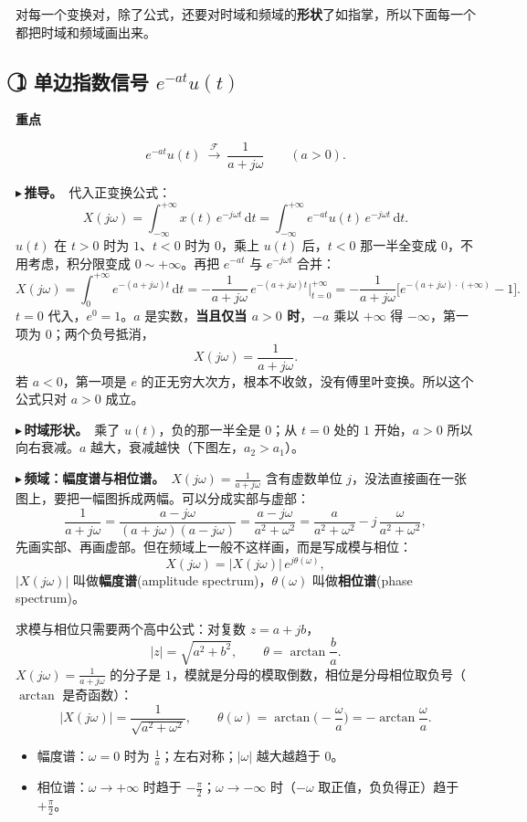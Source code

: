 \documentclass[UTF8,a4paper,11pt]{ctexart}
\newcommand{\dd}{\mathrm{d}}
\newcommand{\F}{\mathcal{F}}
\newenvironment{remember}{\begin{rememberbox}\textbf{重点}\par\smallskip}{\end{rememberbox}}
\newcounter{ex}[section]
\newcommand{\point}[1]{\par\addvspace{1ex}\noindent\textcolor{ptteal}{$\blacktriangleright$\,\textbf{#1}}\ }
\begin{document}
对每一个变换对，除了公式，还要对时域和频域的\textbf{形状}了如指掌，所以下面每一个都把时域和频域画出来。

\subsection{\texorpdfstring{\textcircled{\scriptsize 1} 单边指数信号 $e^{-at}u(t)$}{① 单边指数信号}}\label{sub:exp}
\begin{remember}
\[
e^{-at}u(t)\ \xrightarrow{\ \F\ }\ \frac1{a+j\omega}\qquad(a>0).
\]
\end{remember}

\point{推导。}代入正变换公式：
\[
X(j\omega)=\int_{-\infty}^{+\infty}x(t)\,e^{-j\omega t}\,\dd t=\int_{-\infty}^{+\infty}e^{-at}u(t)\,e^{-j\omega t}\,\dd t .
\]
$u(t)$ 在 $t>0$ 时为 $1$、$t<0$ 时为 $0$，乘上 $u(t)$ 后，$t<0$ 那一半全变成 $0$，不用考虑，积分限变成 $0\sim+\infty$。再把 $e^{-at}$ 与 $e^{-j\omega t}$ 合并：
\[
X(j\omega)=\int_0^{+\infty}e^{-(a+j\omega)t}\,\dd t
=-\frac1{a+j\omega}\,e^{-(a+j\omega)t}\Big|_{t=0}^{+\infty}
=-\frac1{a+j\omega}\Big[e^{-(a+j\omega)\cdot(+\infty)}-1\Big].
\]
$t=0$ 代入，$e^0=1$。$a$ 是实数，\textbf{当且仅当 $a>0$ 时}，$-a$ 乘以 $+\infty$ 得 $-\infty$，第一项为 $0$；两个负号抵消，
\[
X(j\omega)=\frac1{a+j\omega}.
\]
若 $a<0$，第一项是 $e$ 的正无穷大次方，根本不收敛，没有傅里叶变换。所以这个公式只对 $a>0$ 成立。

\point{时域形状。}乘了 $u(t)$，负的那一半全是 $0$；从 $t=0$ 处的 $1$ 开始，$a>0$ 所以向右衰减。$a$ 越大，衰减越快（下图左，$a_2>a_1$）。

\point{频域：幅度谱与相位谱。}$X(j\omega)=\frac1{a+j\omega}$ 含有虚数单位 $j$，没法直接画在一张图上，要把一幅图拆成两幅。可以分成实部与虚部：
\[
\frac1{a+j\omega}=\frac{a-j\omega}{(a+j\omega)(a-j\omega)}=\frac{a-j\omega}{a^2+\omega^2}=\frac{a}{a^2+\omega^2}-j\,\frac{\omega}{a^2+\omega^2},
\]
先画实部、再画虚部。但在频域上一般不这样画，而是写成模与相位：
\[
X(j\omega)=|X(j\omega)|\,e^{j\theta(\omega)},
\]
$|X(j\omega)|$ 叫做\textbf{幅度谱}(amplitude spectrum)，$\theta(\omega)$ 叫做\textbf{相位谱}(phase spectrum)。

求模与相位只需要两个高中公式：对复数 $z=a+jb$，
\[
|z|=\sqrt{a^2+b^2},\qquad \theta=\arctan\frac ba .
\]
$X(j\omega)=\frac1{a+j\omega}$ 的分子是 $1$，模就是分母的模取倒数，相位是分母相位取负号（$\arctan$ 是奇函数）：
\[
|X(j\omega)|=\frac1{\sqrt{a^2+\omega^2}},\qquad
\theta(\omega)=\arctan\Big(-\frac\omega a\Big)=-\arctan\frac\omega a .
\]
\begin{itemize}[nosep]
\item 幅度谱：$\omega=0$ 时为 $\frac1a$；左右对称；$|\omega|$ 越大越趋于 $0$。
\item 相位谱：$\omega\to+\infty$ 时趋于 $-\frac\pi2$；$\omega\to-\infty$ 时（$-\omega$ 取正值，负负得正）趋于 $+\frac\pi2$。
\end{itemize}
\end{document}
